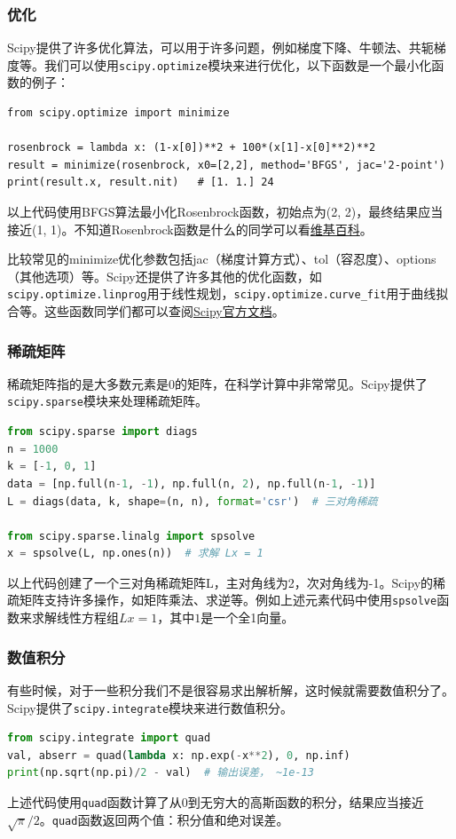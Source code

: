 \documentclass[../main.tex]{subfiles}
\begin{document}
\subsubsection{优化}
Scipy提供了许多优化算法，可以用于许多问题，例如梯度下降、牛顿法、共轭梯度等。我们可以使用\texttt{scipy.optimize}模块来进行优化，以下函数是一个最小化函数的例子：
\begin{lstlisting}
from scipy.optimize import minimize

rosenbrock = lambda x: (1-x[0])**2 + 100*(x[1]-x[0]**2)**2
result = minimize(rosenbrock, x0=[2,2], method='BFGS', jac='2-point')
print(result.x, result.nit)   # [1. 1.] 24
\end{lstlisting}
以上代码使用BFGS算法最小化Rosenbrock函数，初始点为(2, 2)，最终结果应当接近(1, 1)。不知道Rosenbrock函数是什么的同学可以看\href{https://en.wikipedia.org/wiki/Rosenbrock_function}{维基百科}。

比较常见的minimize优化参数包括jac（梯度计算方式）、tol（容忍度）、options（其他选项）等。Scipy还提供了许多其他的优化函数，如\texttt{scipy.optimize.linprog}用于线性规划，\texttt{scipy.optimize.curve\_fit}用于曲线拟合等。这些函数同学们都可以查阅\href{https://docs.scipy.org/doc/scipy/reference/optimize.html}{Scipy官方文档}。

\subsubsection{稀疏矩阵}

稀疏矩阵指的是大多数元素是0的矩阵，在科学计算中非常常见。Scipy提供了\texttt{scipy.sparse}模块来处理稀疏矩阵。

\begin{lstlisting}[language=python]
from scipy.sparse import diags
n = 1000
k = [-1, 0, 1]
data = [np.full(n-1, -1), np.full(n, 2), np.full(n-1, -1)]
L = diags(data, k, shape=(n, n), format='csr')  # 三对角稀疏

from scipy.sparse.linalg import spsolve
x = spsolve(L, np.ones(n))  # 求解 Lx = 1
\end{lstlisting}
以上代码创建了一个三对角稀疏矩阵L，主对角线为2，次对角线为-1。Scipy的稀疏矩阵支持许多操作，如矩阵乘法、求逆等。例如上述元素代码中使用\texttt{spsolve}函数来求解线性方程组$Lx = 1$，其中$1$是一个全1向量。

\subsubsection{数值积分}

有些时候，对于一些积分我们不是很容易求出解析解，这时候就需要数值积分了。Scipy提供了\texttt{scipy.integrate}模块来进行数值积分。
\begin{lstlisting}[language=python]
from scipy.integrate import quad
val, abserr = quad(lambda x: np.exp(-x**2), 0, np.inf)
print(np.sqrt(np.pi)/2 - val)  # 输出误差， ~1e-13
\end{lstlisting}
上述代码使用\texttt{quad}函数计算了从0到无穷大的高斯函数的积分，结果应当接近$\sqrt{\pi}/2$。\texttt{quad}函数返回两个值：积分值和绝对误差。
\end{document}
